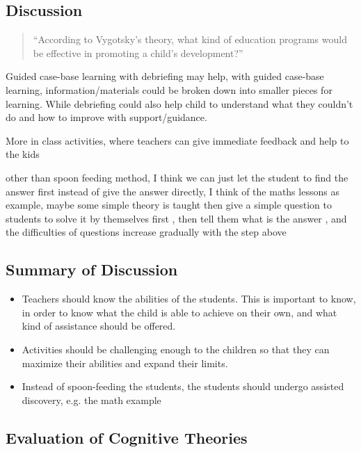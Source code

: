 \documentclass[../main/main.tex]{subfiles}
\begin{document}
\subsection{Discussion}
\begin{quote}
``According to Vygotsky's theory, what kind of education programs would be effective in promoting a child's development?''
\end{quote}
\begin{example}
Guided case-base learning with debriefing may help, with guided case-base learning, information/materials could be broken down into smaller pieces for learning. While debriefing could also help child to understand what they couldn’t do and how to improve with support/guidance.
\end{example}
\begin{example}
More in class activities, where teachers can give immediate feedback and help to the kids
\end{example}
\begin{example}
  other than spoon feeding method, I think we can just let the student to find the answer first instead of give the answer directly, I think of the maths lessons as example, maybe some simple theory is taught then give a simple question to students to solve it by themselves first , then tell them what is the answer , and the difficulties of questions increase gradually with the step above
\end{example}
\subsection{Summary of Discussion}
\begin{itemize}
\item
Teachers should know the abilities of the students. This is important to know, in order to know what the child is able to achieve on their own, and what kind of assistance should be offered.
        \item
Activities should be challenging enough to the children so that they can maximize their abilities and expand their limits.
  \item Instead of spoon-feeding the students, the students should undergo assisted discovery, e.g. the math example
\end{itemize}
\subsection{Evaluation of Cognitive Theories}
\end{document}
